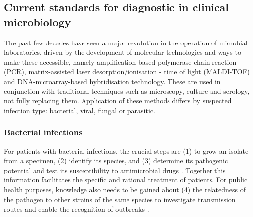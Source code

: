 \subsection{Current standards for diagnostic in clinical microbiology}

The past few decades have seen a major revolution in the operation of microbial laboratories, driven by the development of molecular technologies and ways to make these accessible, namely amplification-based polymerase chain reaction (PCR), matrix-assisted laser desorption/ionisation - time of light (MALDI-TOF) and DNA-microarray-based hybridisation technology. These are used in conjunction with traditional techniques such as microscopy, culture and serology, not fully replacing them. Application of these methods differs by suspected infection type: bacterial, viral, fungal or parasitic.

\subsubsection{Bacterial infections}

For patients with bacterial infections, the crucial steps are (1) to grow an isolate from a specimen, (2) identify its species, and (3) determine its pathogenic potential and test its susceptibility to antimicrobial drugs  \citep{didelot_transforming_2012}. Together this information facilitates the specific and rational treatment of patients. For public health purposes, knowledge also needs to be gained about (4) the relatedness of the pathogen to other strains of the same species to investigate transmission routes and enable the recognition of outbreaks \citep{foxman_choosing_2005}. 

